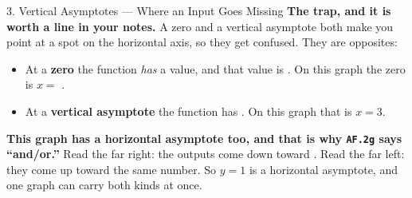 \documentclass[10pt]{article}
\begin{document}
\begin{notesbox}{3. Vertical Asymptotes --- Where an Input Goes Missing}
\vspace{4pt}
\textbf{The trap, and it is worth a line in your notes.} A zero and a vertical asymptote both make
you point at a spot on the horizontal axis, so they get confused. They are opposites:
\begin{itemize}[leftmargin=1.3em, itemsep=2pt, topsep=3pt]
  \item At a \textbf{zero} the function \emph{has} a value, and that value is \blank{1.2cm}. On this
        graph the zero is $x=$ \blank{1.4cm}.
  \item At a \textbf{vertical asymptote} the function has \blank{3.4cm}. On this graph that is
        $x=3$.
\end{itemize}

\vspace{4pt}
\textbf{This graph has a horizontal asymptote too, and that is why \texttt{AF.2g} says ``and/or.''}
Read the far right: the outputs come down toward \blank{1.2cm}. Read the far left: they come up
toward the same number. So $y=1$ is a horizontal asymptote, and one graph can carry both kinds at
once.
\end{notesbox}

\vspace{0.10in}
\end{document}

